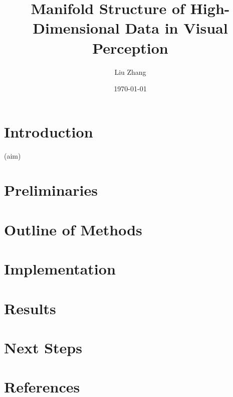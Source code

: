 \documentclass{article}
\title{Manifold Structure of High-Dimensional Data in Visual Perception}
\author{Liu Zhang}
\date{\today}
\begin{document}
\maketitle
\section{Introduction}
(aim)
\section{Preliminaries}

\section{Outline of Methods}

\section{Implementation}

\section{Results}

\section{Next Steps}

\section{References}


\end{document}
